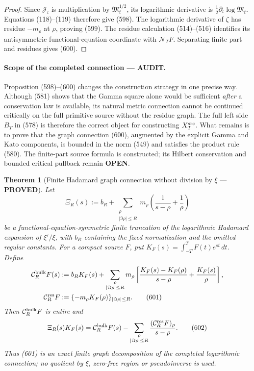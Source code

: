 \documentclass[11pt]{article}
\newtheorem{theorem}{Theorem}
\newcommand{\PROVED}{\textcolor{green!45!black}{\textbf{PROVED}}}
\newcommand{\OPEN}{\textcolor{red!70!black}{\textbf{OPEN}}}
\newcommand{\AUDIT}{\textcolor{orange!75!black}{\textbf{AUDIT}}}
\begin{document}
\begin{proof}
Since \(\mathcal J_t\) is multiplication by
\(\mathfrak M_t^{1/2}\), its logarithmic derivative is
\(\frac12\partial_t\log\mathfrak M_t\).  Equations (118)--(119) therefore
give (598).  The logarithmic derivative of \(\zeta\) has residue
\(-m_\rho\) at \(\rho\), proving (599).  The residue calculation
(514)--(516) identifies its antisymmetric functional-equation coordinate
with \(\mathcal N_TF\).  Separating finite part and residues gives (600).
\end{proof}

\paragraph{Scope of the completed connection --- \AUDIT.}
Proposition (598)--(600) changes the construction strategy in one precise
way.  Although (581) shows that the Gamma square alone would be sufficient
\emph{after} a conservation law is available, its natural metric connection
cannot be continued critically on the full primitive source without the
residue graph.  The full left side \(B_T\) in (578) is therefore the correct
object for constructing \(X_T^{\rm src}\).  What remains is to prove that
the graph connection (600), augmented by the explicit Gamma and Kato
components, is bounded in the norm (549) and satisfies the product rule
(580).  The finite-part source formula is constructed; its Hilbert
conservation and bounded critical pullback remain \OPEN{}.

\begin{theorem}[Finite Hadamard graph connection without division by
\(\xi\) --- \PROVED]
Let
\[
 \Xi_R(s):=b_R+\sum_{\substack{\rho\\|\Im\rho|\le R}}
 m_\rho\left(\frac1{s-\rho}+\frac1{\rho}\right)
\]
be a functional-equation-symmetric finite truncation of the logarithmic
Hadamard expansion of \(\xi'/\xi\), with \(b_R\) containing the fixed
normalization and the omitted regular constants.  For a compact source
\(F\), put \(K_F(s)=\int_{-T}^{T}F(t)e^{st}\,dt\).  Define
\begin{align}
 \mathcal C_R^{\rm bulk}F(s)
 &:=
 b_RK_F(s)+
 \sum_{\substack{\rho\\|\Im\rho|\le R}}m_\rho
 \left[
  \frac{K_F(s)-K_F(\rho)}{s-\rho}
  +\frac{K_F(s)}{\rho}\right],\notag\\
 \mathcal C_R^{\rm res}F
 &:=
 \{-m_\rho K_F(\rho)\}_{|\Im\rho|\le R}.             \tag{601}
\end{align}
Then \(\mathcal C_R^{\rm bulk}F\) is entire and
\begin{equation}
 \Xi_R(s)K_F(s)
 =\mathcal C_R^{\rm bulk}F(s)
  -\sum_{\substack{\rho\\|\Im\rho|\le R}}
       \frac{(\mathcal C_R^{\rm res}F)_\rho}{s-\rho}.
                                                               \tag{602}
\end{equation}
Thus (601) is an exact finite graph decomposition of the completed
logarithmic connection; no quotient by \(\xi\), zero-free region or
pseudoinverse is used.
\end{theorem}
\end{document}
